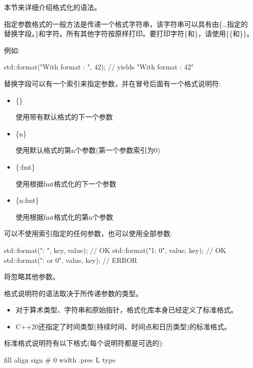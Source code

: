 
本节来详细介绍格式化的语法。


指定参数格式的一般方法是传递一个格式字符串，该字符串可以具有由\{…指定的替换字段。\}和字符。所有其他字符按原样打印。要打印字符\{和\}，请使用\{\{和\}\}。

例如:

\begin{cpp}
std::format("With format {{}}: {}", 42); // yields "With format {}: 42"
\end{cpp}

替换字段可以有一个索引来指定参数，并在冒号后面有一个格式说明符:

\begin{itemize}
\item
\{\}

使用带有默认格式的下一个参数

\item
\{n\}

使用默认格式的第n个参数(第一个参数索引为0)

\item
\{:fmt\}

使用根据fmt格式化的下一个参数

\item
\{n:fmt\}

使用根据fmt格式化的第n个参数
\end{itemize}

可以不使用索引指定的任何参数，也可以使用全部参数:

\begin{cpp}
std::format("{}: {}", key, value); // OK
std::format("{1}: {0}", value, key); // OK
std::format("{}: {} or {0}", value, key); // ERROR
\end{cpp}

将忽略其他参数。

格式说明符的语法取决于所传递参数的类型。

\begin{itemize}
\item
对于算术类型、字符串和原始指针，格式化库本身已经定义了标准格式。

\item
C++20还指定了时间类型(持续时间、时间点和日历类型)的标准格式。
\end{itemize}


标准格式说明符有以下格式(每个说明符都是可选的):

\begin{shell}
fill align sign # 0 width .prec L type
\end{shell}

